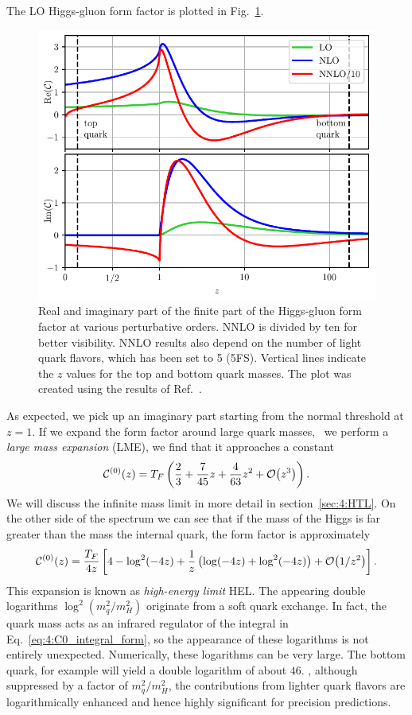 The \acs{LO} Higgs-gluon form factor is plotted in Fig.~\ref{fig:4:form_factor}.
\begin{figure}[h]
\centering
\includegraphics[width=\figurewidth]{Images/form_factor.pdf}
\caption{Real and imaginary part of the finite part of the Higgs-gluon form factor at various perturbative orders. \acs{NNLO} is divided by ten for better visibility. \acs{NNLO} results also depend on the number of light quark flavors, which has been set to 5 (5\acs{FS}). Vertical lines indicate the $z$ values for the top and bottom quark masses. The plot was created using the results of Ref.~\cite{Czakon:2020vql}.}
\label{fig:4:form_factor}
\end{figure}
As expected, we pick up an imaginary part starting from the normal threshold at $z=1$. If we expand the form factor around large quark masses, \ie\ we perform a \textit{large mass expansion} (\acs{LME}), we find that it approaches a constant
\begin{equation}
\mathcal{C}^{(0)}(z) = T_F \left( \frac{2}{3} + \frac{7}{45} z + \frac{4}{63} z^2 + \mathcal{O}\!\left(z^3\right) \right).
\label{eq:4:LME}
\end{equation}
We will discuss the infinite mass limit in more detail in section~\ref{sec:4:HTL}. On the other side of the spectrum we can see that if the mass of the Higgs is far greater than the mass the internal quark, the form factor is approximately
\begin{equation}
\mathcal{C}^{(0)}(z) = \frac{T_F}{4z} \left[ 4 - \log^2\!\left(-4 z \right) + \frac{1}{z} \left( \log\!\left(-4 z \right) + \log^2\!\left(-4 z \right) \right) + \mathcal{O}\!\left(1/z^2\right) \right].
\end{equation}
This expansion is known as \textit{high-energy limit} \acs{HEL}. The appearing double logarithms $\log^2 (m_q^2/m_H^2)$ originate from a soft quark exchange. In fact, the quark mass acts as an infrared regulator of the integral in Eq.~\ref{eq:4:C0_integral_form}, so the appearance of these logarithms is not entirely unexpected. Numerically, these logarithms can be very large. The bottom quark, for example will yield a double logarithm of about $46$. \Ie, although suppressed by a factor of $m_q^2/m_H^2$, the contributions from lighter quark flavors are logarithmically enhanced and hence highly significant for precision predictions.

